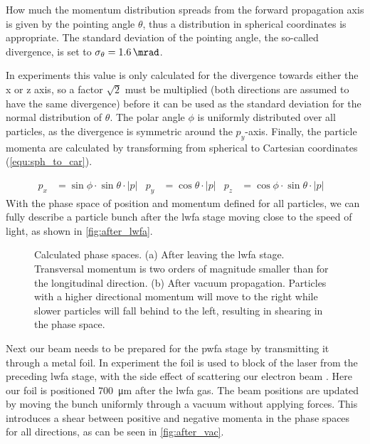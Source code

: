 \documentclass[bachelor_thesis]{subfiles}
\begin{document}
How much the momentum distribution spreads from the forward propagation axis is given by the pointing angle $\theta$, thus a distribution in spherical coordinates is appropriate. The standard deviation of the pointing angle, 
the so-called divergence, is set to $\sigma_{\theta}=\qty{1.6}{\mrad}$.

In experiments this value is only calculated for the divergence towards either the x or z axis, so a factor $\sqrt{2}$ must be multiplied (both directions are assumed to have the same divergence) before 
it can be used as the standard deviation for the normal distribution of $\theta$. The polar angle $\phi$ is uniformly distributed over all particles, as the divergence is symmetric around the $p_y$-axis.
Finally, the particle momenta are calculated by transforming from spherical to Cartesian coordinates (\autoref{equ:sph_to_car}). 

\begin{align}
	p_x&=\sin{\phi} \cdot \sin{\theta} \cdot \left|p\right|	&
	p_y&=\cos{\theta} \cdot \left|p\right|				&
	p_z&=\cos{\phi} \cdot \sin{\theta} \cdot \left|p\right|	&
	\label{equ:sph_to_car}
\end{align}
With the phase space of position and momentum defined for all particles, we can fully describe a particle bunch after the \gls{lwfa} stage moving close to the speed of light, as shown in \autoref{fig:after_lwfa}.

\begin{figure}
	\centering
	\begin{subfigure}{\textwidth}
		\centering
		\missingfigure{}
		\caption{}
		\label{fig:after_lwfa}
	\end{subfigure}
	\newline
	\begin{subfigure}{\textwidth}
		\centering
		\missingfigure{}
		\caption{}
		\label{fig:after_vac}
	\end{subfigure}
	\caption{Calculated phase spaces. (a) After leaving the \gls{lwfa} stage. Transversal momentum is two orders of magnitude smaller than for the longitudinal direction. (b) After vacuum propagation. Particles with
	a higher directional momentum will move to the right while slower particles will fall behind to the left, resulting in shearing in the phase space.}
	\label{fig:phasespace}
\end{figure}

Next our beam needs to be prepared for the \gls{pwfa} stage by transmitting it through a metal foil. In experiment the foil is used to block of the laser from the preceding \gls{lwfa} stage, 
with the side effect of scattering our electron beam \cite{Raj2020}. Here our foil is positioned \qty{700}{\um} after the \gls{lwfa} gas.
The beam positions are updated by moving the bunch uniformly through a vacuum without applying forces. This introduces a shear between positive and negative momenta in the phase spaces for all directions, as can be seen in \autoref{fig:after_vac}.
\end{document}
